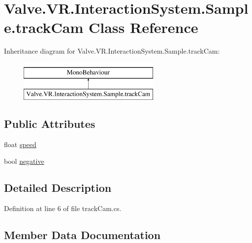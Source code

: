 \hypertarget{class_valve_1_1_v_r_1_1_interaction_system_1_1_sample_1_1track_cam}{}\section{Valve.\+V\+R.\+Interaction\+System.\+Sample.\+track\+Cam Class Reference}
\label{class_valve_1_1_v_r_1_1_interaction_system_1_1_sample_1_1track_cam}
Inheritance diagram for Valve.\+V\+R.\+Interaction\+System.\+Sample.\+track\+Cam\+:\begin{figure}[H]
\begin{center}
\leavevmode
\includegraphics[height=2.000000cm]{class_valve_1_1_v_r_1_1_interaction_system_1_1_sample_1_1track_cam}
\end{center}
\end{figure}
\subsection*{Public Attributes}
\begin{DoxyCompactItemize}
\item 
float \mbox{\hyperlink{class_valve_1_1_v_r_1_1_interaction_system_1_1_sample_1_1track_cam_a3be7ac641bae5c15792a9211f2018a72}{speed}}
\item 
bool \mbox{\hyperlink{class_valve_1_1_v_r_1_1_interaction_system_1_1_sample_1_1track_cam_a37ff89a4be5b24d30fac3ea41fc3c5e3}{negative}}
\end{DoxyCompactItemize}


\subsection{Detailed Description}


Definition at line 6 of file track\+Cam.\+cs.



\subsection{Member Data Documentation}
\mbox{\label{class_valve_1_1_v_r_1_1_interaction_system_1_1_sample_1_1track_cam_a37ff89a4be5b24d30fac3ea41fc3c5e3}} 
